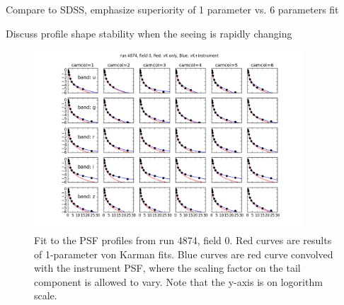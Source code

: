 Compare to SDSS, emphasize superiority of 1 parameter vs. 6 parameters fit

Discuss profile shape stability when the seeing is rapidly  changing 

\begin{figure}
\centering
\includegraphics[width=0.9\textwidth]{FIGURES/psffit.png}
\caption{Fit to the PSF profiles from run 4874, field 0. Red curves
  are results of 1-parameter von Karman fits. Blue curves are red
  curve convolved with the instrument PSF, where the scaling factor on
  the tail component is allowed to vary. Note that the y-axis is on
  logorithm scale.
\label{fig:psffit}}
\end{figure}
